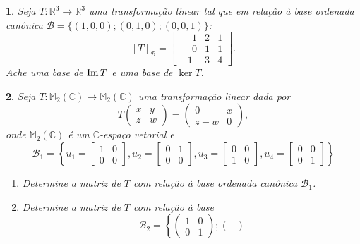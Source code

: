 \documentclass[12pt]{exam}
\newtheorem{exercicio}{}
\newcommand{\im}{{\rm Im\,}}
\newcommand{\real}{\mathbb{R}}
\newcommand{\complex}{\mathbb{C}}
\newcommand{\cp}[1]{\mathbb{#1}}
\begin{document}
\begin{exercicio}
  Seja $T : \real^3 \to \real^3$ uma transforma\c{c}\~ao linear tal que em rela\c{c}\~ao \`a base ordenada can\^onica $\mathcal{B} = \{(1,0,0); (0,1,0); (0,0,1)\}$:
  \[
    [T]_\mathcal{B} =\begin{bmatrix}
      \phantom{-}1 & 2 & 1\\
      \phantom{-} 0 & 1 & 1\\
      -1 & 3 & 4
    \end{bmatrix}.
  \]
  Ache uma base de $\im T$ e uma base de $\ker T$.
\end{exercicio}

\begin{exercicio}
  Seja $T : \cp{M}_2(\complex) \to \cp{M}_2(\complex)$ uma transforma\c{c}\~ao linear dada por
  \[
    T \begin{pmatrix}
      x & y\\
      z & w
    \end{pmatrix} = \begin{pmatrix}
      0 & x\\
      z - w & 0
    \end{pmatrix},
  \]
  onde $\cp{M}_2(\complex)$ \'e um $\complex$-espa\c{c}o vetorial
  e
  \[
      \mathcal{B}_1 = \left\{u_1 = \begin{bmatrix}
        1 & 0\\0 & 0
      \end{bmatrix}, u_2 = \begin{bmatrix}
        0 & 1\\0 & 0
      \end{bmatrix}, u_3 = \begin{bmatrix}
        0 & 0\\1 & 0
      \end{bmatrix}, u_4 = \begin{bmatrix}
        0 & 0\\0 & 1
      \end{bmatrix}\right\}
  \]
    \begin{enumerate}[label=({\alph*})]
      \item Determine a matriz de $T$ com rela\c{c}\~ao \`a base ordenada can\^onica $\mathcal{B}_1$.
      \item Determine a matriz de $T$ com rela\c{c}\~ao \`a base
      \[
        \mathcal{B}_2 = \left\{\begin{pmatrix}
          1 & 0\\
          0 & 1
        \end{pmatrix}; \begin{pmatrix}

\end{pmatrix}\]
\end{enumerate}
\end{exercicio}
\end{document}

